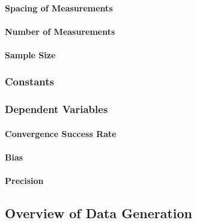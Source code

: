 \documentclass[
12pt, %
twoside,
english]{guelphthesis}
\begin{document}
\hypertarget{spacing-of-measurements-1}{%
\paragraph{Spacing of Measurements}\label{spacing-of-measurements-1}}

\hypertarget{number-of-measurements-1}{%
\paragraph{Number of Measurements}\label{number-of-measurements-1}}

\hypertarget{sample-size}{%
\paragraph{Sample Size}\label{sample-size}}

\hypertarget{constants-1}{%
\subsubsection{Constants}\label{constants-1}}

\hypertarget{dependent-variables-1}{%
\subsubsection{Dependent Variables}\label{dependent-variables-1}}

\hypertarget{convergence-success-rate}{%
\paragraph{Convergence Success Rate}\label{convergence-success-rate}}

\hypertarget{bias}{%
\paragraph{Bias}\label{bias}}

\hypertarget{precision}{%
\paragraph{Precision}\label{precision}}

\hypertarget{overview-of-data-generation}{%
\subsection{Overview of Data Generation}\label{overview-of-data-generation}}
\end{document}
